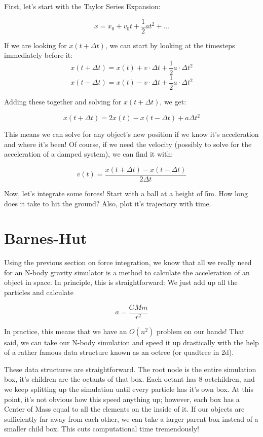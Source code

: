 \documentclass[11pt]{article}
\begin{document}
First, let's start with the Taylor Series Expansion:

$$x = x_0 + v_0 t + \frac{1}{2}at^2 + \ldots$$

If we are looking for $x(t + \Delta t)$, we can start by looking at the timesteps immediately before it:
$$x(t+\Delta t) = x(t) + v \cdot \Delta t + \frac{1}{2} a\cdot\Delta t^2$$
$$x(t-\Delta t) = x(t) - v \cdot \Delta t + \frac{1}{2} a\cdot\Delta t^2$$

Adding these together and solving for $x(t + \Delta t)$, we get:

$$x(t + \Delta t) = 2x(t) - x(t - \Delta t) + a \Delta t^2$$

This means we can solve for any object's new position if we know it's acceleration and where it's been! Of course, if we need the velocity (possibly to solve for the acceleration of a damped system), we can find it with:

$$v(t) = \frac{x(t + \Delta t) - x(t - \Delta t)}{2\Delta t}$$

Now, let's integrate some forces! Start with a ball at a height of 5m. How long does it take to hit the ground? Also, plot it's trajectory with time.

\newpage
\section*{Barnes-Hut}
Using the previous section on force integration, we know that all we really need for an N-body gravity simulator is a method to calculate the acceleration of an object in space. In principle, this is straightforward: We just add up all the particles and calculate

$$a = \frac{GMm}{r^2}$$

In practice, this means that we have an $O(n^2)$ problem on our hands! That said, we can take our N-body simulation and speed it up drastically with the help of a rather famous data structure known as an octree (or quadtree in 2d).

These data structures are straightforward. The root node is the entire simulation box, it's children are the octants of that box. Each octant has 8 octchildren, and we keep splitting up the simulation until every particle has it's own box. At this point, it's not obvious how this speed anything up; however, each box has a Center of Mass equal to all the elements on the inside of it. If our objects are sufficiently far away from each other, we can take a larger parent box instead of a smaller child box. This cuts computational time tremendously!
\end{document}
